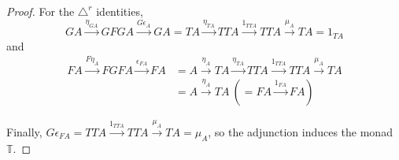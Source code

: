 \documentclass[a4paper]{article}
\numberwithin{definition}{section}
\begin{document}
\begin{proof}
	For the $\triangle^r$ identities,
	$$GA \overset{\eta_{GA}}{\to} GFGA \overset{G\epsilon_A}{\to} GA = TA \overset{\eta_{TA}}{\to} TTA \overset{1_{TTA}}{\to} TTA \overset{\mu_A}{\to} TA = 1_{TA}$$
	and
	\begin{align*}
		FA \overset{F\eta_A}{\to} FGFA \overset{\epsilon_{FA}}{\to} FA &= A \overset{\eta_A}{\to} TA \overset{\eta_{TA}}{\to} TTA \overset{1_{TTA}}{\to} TTA \overset{\mu_A}{\to} TA \\
		&= A \overset{\eta_A}{\to} TA\ (= FA \overset{1_{FA}}{\to} FA)
	\end{align*}
	
	Finally, $G\epsilon_{FA} = TTA \overset{1_{TTA}}{\to} TTA \overset{\mu_A}{\to} TA = \mu_A$,
	so the adjunction induces the monad $\mathbb{T}$.
\end{proof}
\end{document}
